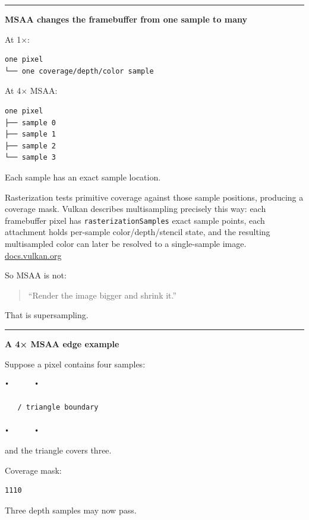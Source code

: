 \begin{center}\rule{0.5\linewidth}{0.5pt}\end{center}

\textbf{MSAA changes the framebuffer from one sample to many}

At 1×:

\begin{verbatim}
one pixel
└── one coverage/depth/color sample
\end{verbatim}

At 4× MSAA:

\begin{verbatim}
one pixel
├── sample 0
├── sample 1
├── sample 2
└── sample 3
\end{verbatim}

Each sample has an exact sample location.

Rasterization tests primitive coverage against those sample positions, producing a coverage mask. Vulkan describes multisampling precisely this way: each framebuffer pixel has \texttt{rasterizationSamples} exact sample points, each attachment holds per-sample color/depth/stencil state, and the resulting multisampled color can later be resolved to a single-sample image. \href{https://docs.vulkan.org/spec/latest/chapters/primsrast.html?utm_source=chatgpt.com}{docs.vulkan.org}

So MSAA is not:

\begin{quote}
``Render the image bigger and shrink it.''
\end{quote}

That is supersampling.

\begin{center}\rule{0.5\linewidth}{0.5pt}\end{center}

\textbf{A 4× MSAA edge example}

Suppose a pixel contains four samples:

\begin{verbatim}
•      •

   / triangle boundary

•      •
\end{verbatim}

and the triangle covers three.

Coverage mask:

\begin{verbatim}
1110
\end{verbatim}

Three depth samples may now pass.

